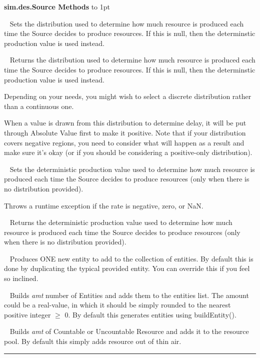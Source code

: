 \documentclass[twoside,10pt]{article}
\newcommand\class[1]{\index{Classes!{#1}}\textsf{#1}}
\newcommand*{\xfill}[1][0pt]{%
	\cleaders
		\hbox to 1pt{\hss
			\raisebox{#1}{\rule{1.2pt}{0.4pt}}%
			\hss}\hfill}
\newenvironment{methods}[1]{
\vspace{1.0em}\noindent\textsf{\textbf{#1 Methods}}\quad \xfill[0.5ex]
\vspace{-0.25em}
\begin{description}
\small}
{\end{description}\hrule\vspace{1.5em}}
\newcommand{\mthd}[1]{\item[{\sf #1}]~\newline}
\begin{document}
\begin{methods}{\class{sim.des.Source}}
\mthd{public void setProductionDistribution(AbstractDistribution productionDistribution)}
Sets the distribution used to determine how much resource is produced each time the Source
        decides to produce resources.  If this is null, then the determinstic production value is used instead.
        
\mthd{public AbstractDistribution getProductionDistribution()}
Returns the distribution used to determine how much resource is produced each time the Source
        decides to produce resources.  If this is null, then the determinstic production value is used instead.
        
        Depending on your needs, you might wish to select a discrete distribution rather than 
        a continuous one.
        
        When a value is drawn from this distribution to determine
        delay, it will be put through Absolute Value first to make it positive.  Note that if your 
        distribution covers negative regions, you need to consider what will happen as a result and 
        make sure it's okay (or if you should be considering a positive-only distribution).
        
\mthd{public void setProduction(double amt)}
Sets the deterministic production value used to determine how much resource is produced each time the Source
        decides to produce resources (only when there is no distribution provided).

        Throws a runtime exception if the rate is negative, zero, or NaN.
        
\mthd{public void getProduction()}
Returns the deterministic production value used to determine how much resource is produced each time the Source
        decides to produce resources (only when there is no distribution provided).
        
\mthd{protected Entity buildEntity()}
Produces ONE new entity to add to the collection of entities.
       By default this is done by duplicating the typical provided entity.
       You can override this if you feel so inclined.
       
\mthd{protected void buildEntities(double amt)}
Builds {\it amt} number of Entities and adds them to the entities list.  
        The amount could be a real-value, in which it should be
        simply rounded to the nearest positive integer \(\geq\) 0.  By default this
        generates entities using buildEntity().
        
\mthd{protected void buildResource(double amt)}
Builds {\it amt} of Countable or Uncountable Resource and adds it to the resource pool. 
        By default this simply adds resource out of thin air. 
        

\end{methods}
\end{document}
